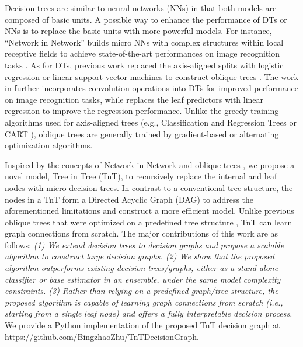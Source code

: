 \documentclass{article}
\begin{document}
Decision trees are similar to neural networks (NNs) in that both models are composed of basic units. A possible way to enhance the performance of DTs or NNs is to replace the basic units with more powerful models. For instance, ``Network in Network'' builds micro NNs with complex structures within local receptive fields to achieve state-of-the-art performances on image recognition tasks \cite{lin2013network}. As for DTs, previous work replaced the axis-aligned splits with logistic regression or linear support vector machines to construct oblique trees \cite{carreira2018alternating, zharmagambetov2020smaller, norouzi2015efficient, kontschieder2015deep, zhu2020resot, hazimeh2020tree}. The work in \cite{tanno2019adaptive} further incorporates convolution operations into DTs for improved performance on image recognition tasks, while \cite{zharmagambetov2020smaller} replaces the leaf predictors with linear regression to improve the regression performance. Unlike the greedy training algorithms used for axis-aligned trees (e.g., Classification and Regression Trees or CART \cite{steinberg2009cart}), oblique trees are generally trained by gradient-based  \cite{kontschieder2015deep,zhu2020resot,hazimeh2020tree} or alternating  \cite{carreira2018alternating, zharmagambetov2020smaller} optimization algorithms.

Inspired by the concepts of Network in Network \cite{lin2013network} and oblique trees \cite{carreira2018alternating, norouzi2015efficient}, we propose a novel model, Tree in Tree (TnT), to recursively replace the internal and leaf nodes with micro decision trees. In contrast to a conventional tree structure, the nodes in a TnT form a Directed Acyclic Graph (DAG) to address the aforementioned limitations and construct a more efficient model. Unlike previous oblique trees that were optimized on a predefined tree structure \cite{tanno2019adaptive, zharmagambetov2020smaller}, TnT can learn graph connections from scratch. The major contributions of this work are as follows: \textit{(1) We extend decision trees to decision graphs and propose a scalable algorithm to construct large decision graphs. (2) We show that the proposed algorithm outperforms existing decision trees/graphs, either as a stand-alone classifier or base estimator in an ensemble,  under the same model complexity constraints. (3) Rather than relying on a predefined graph/tree structure, the proposed algorithm is capable of learning graph connections from scratch (i.e., starting from a single leaf node) and offers a fully interpretable decision process.} We provide a Python implementation of the proposed TnT decision graph at \url{https://github.com/BingzhaoZhu/TnTDecisionGraph}.
\end{document}
